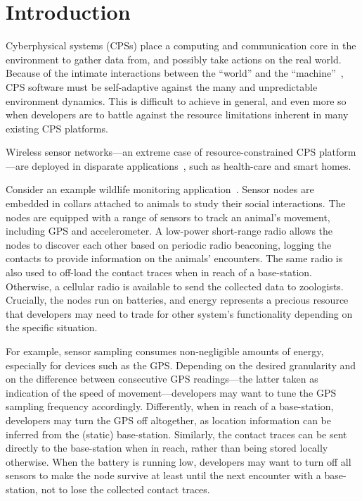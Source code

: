 \section{Introduction}

Cyberphysical systems (CPSs) place a computing and communication core
in the environment to gather data from, and possibly take actions on
the real world. Because of the intimate interactions between the
``world'' and the ``machine''~\cite{jackson}, CPS software must be
self-adaptive against the many and unpredictable environment
dynamics. This is difficult to achieve in general, and even more so
when developers are to battle against the resource limitations
inherent in many existing CPS platforms.

 Wireless sensor networks---an extreme case of
resource-constrained CPS platform---are deployed in disparate
applications~\cite{someSURVEY}, such as health-care and smart homes.

Consider an example wildlife monitoring application~\cite{badgers}. Sensor
nodes are embedded in collars attached to animals to study their
social interactions. The nodes are equipped with a range of sensors to
track an animal's movement, including GPS and accelerometer. A
low-power short-range radio allows the nodes to discover each other
based on periodic radio beaconing, logging the contacts to provide
information on the animals' encounters. The same radio is also used
to off-load the contact traces when in reach of a
base-station. Otherwise, a cellular radio is available to
send the collected data to zoologists. Crucially, the nodes run on
batteries, and energy represents a precious resource that developers
may need to trade for other system's functionality depending on the
specific situation.

For example, sensor sampling consumes non-negligible amounts of
energy, especially for devices such as the
GPS. Depending on the desired granularity and on the difference
between consecutive GPS readings---the latter taken as indication of
the speed of movement---developers may want to tune the GPS sampling
frequency accordingly. Differently, when in reach of a base-station,
developers may turn the GPS off altogether, as location information can
be inferred from the (static) base-station. Similarly, the contact
traces can be sent directly to the base-station when in reach, rather
than being stored locally otherwise.  When the battery is running low,
developers may want to turn off all sensors to make the node survive
at least until the next encounter with a base-station, not to lose the
collected contact traces.

